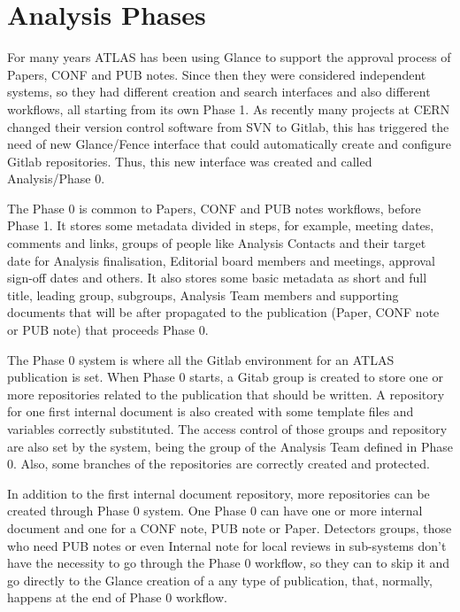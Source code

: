 \section{Analysis Phases}
\label{sec:analysis-phases}

For many years ATLAS has been using Glance to support the approval process of Papers, CONF and PUB notes. Since then they were considered independent systems, so they had different creation and search interfaces and also different workflows, all starting from its own Phase 1. As recently many projects at CERN changed their version control software from SVN to Gitlab, this has triggered the need of new Glance/Fence interface that could automatically create and configure Gitlab repositories. Thus, this new interface was created and called Analysis/Phase 0.

The Phase 0 is common to Papers, CONF and PUB notes workflows, before Phase 1. It stores some metadata divided in steps, for example, meeting dates, comments and links, groups of people like Analysis Contacts and their target date for Analysis finalisation, Editorial board members and meetings, approval sign-off dates and others. It also stores some basic metadata as short and full title, leading group, subgroups, Analysis Team members and supporting documents that will be after propagated to the publication (Paper, CONF note or PUB note) that proceeds Phase 0.

The Phase 0 system is where all the Gitlab environment for an ATLAS publication is set. When Phase 0 starts, a Gitab group is created to store one or more repositories related to the publication that should be written. A repository for one first internal document is also created with some template files and variables correctly substituted. The access control of those groups and repository are also set by the system, being the group of the Analysis Team defined in Phase 0. Also, some branches of the repositories are correctly created and protected.

In addition to the first internal document repository, more repositories can be created through Phase 0 system. One Phase 0 can have one or more internal document and one for a CONF note, PUB note or Paper. Detectors groups, those who need PUB notes or even Internal note for local reviews in sub-systems don’t have the necessity to go through the Phase 0 workflow, so they can to skip it and go directly to the Glance creation of a any type of publication, that, normally, happens at the end of Phase 0 workflow.

